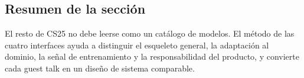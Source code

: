 \subsection{Resumen de la sección}

El resto de CS25 no debe leerse como un catálogo de modelos. El método de las cuatro interfaces ayuda a distinguir el esqueleto general, la adaptación al dominio, la señal de entrenamiento y la responsabilidad del producto, y convierte cada guest talk en un diseño de sistema comparable.
